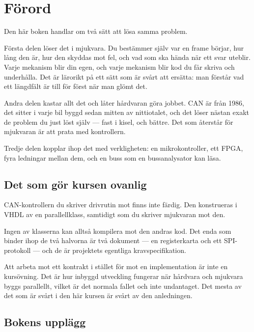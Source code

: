 \chapter*{Förord}

Den här boken handlar om två sätt att lösa samma problem.

Första delen löser det i mjukvara. Du bestämmer själv var en frame börjar, hur lång den är, hur den
skyddas mot fel, och vad som ska hända när ett svar uteblir. Varje mekanism blir din egen, och
varje mekanism blir kod du får skriva och underhålla. Det är lärorikt på ett sätt som är svårt att
ersätta: man förstår vad ett längdfält är till för först när man glömt det.

Andra delen kastar allt det och låter hårdvaran göra jobbet. CAN är från 1986, det sitter i varje
bil byggd sedan mitten av nittiotalet, och det löser nästan exakt de problem du just löst själv
--- fast i kisel, och bättre. Det som återstår för mjukvaran är att prata med kontrollern.

Tredje delen kopplar ihop det med verkligheten: en mikrokontroller, ett FPGA, fyra ledningar
mellan dem, och en buss som en bussanalysator kan läsa.

\section*{Det som gör kursen ovanlig}

CAN-kontrollern du skriver drivrutin mot finns inte färdig. Den konstrueras i VHDL av en
parallellklass, samtidigt som du skriver mjukvaran mot den.

Ingen av klasserna kan alltså kompilera mot den andras kod. Det enda som binder ihop de två
halvorna är två dokument --- en registerkarta och ett SPI-protokoll --- och de är projektets
egentliga kravspecifikation.

\begin{aside}
\note Att arbeta mot ett kontrakt i stället för mot en implementation är inte en kursövning. Det
är hur inbyggd utveckling fungerar när hårdvara och mjukvara byggs parallellt, vilket är det
normala fallet och inte undantaget. Det mesta av det som är svårt i den här kursen är svårt av den
anledningen.
\end{aside}

\section*{Bokens upplägg}

